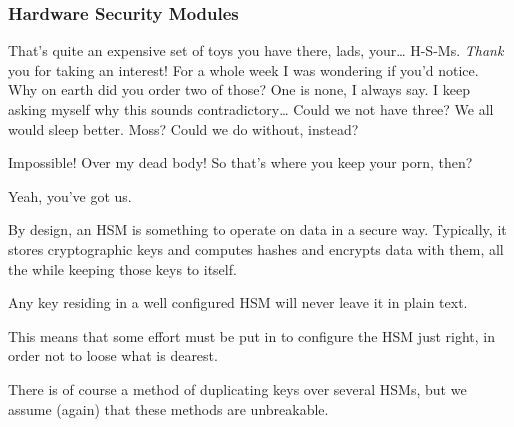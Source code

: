 \subsubsection{Hardware Security Modules}
\begin{dialogue}
		
				That's quite an expensive set of toys you have there, lads, your\ldots
				H-S-Ms.
	\textit{Thank} you for taking an interest!
				For a whole week I was wondering if you'd notice.
		Why on earth did you order two of those?
	One is none, I always say.
				I keep asking myself why this sounds contradictory\ldots
{}		Could we not have three? We all would sleep better. Moss?
		Could we do without, instead?
\par\medskip{}
	
				Impossible!
		
				Over my dead body!
		
				So that's where you keep your porn, then?
\par\medskip{}
		Yeah, you've got us. 
\end{dialogue}
By design,
an HSM is something to operate on data in a secure way.
Typically,
it stores cryptographic keys and computes hashes and encrypts data with them,
all the while keeping those keys to itself.
\begin{moafu}
Any key residing in a well configured HSM will never leave it in plain text.
\end{moafu}
This means that some effort must be put in to configure the HSM just right, in order not to loose what is dearest.
\par
There is of course a method of duplicating keys over several HSMs,
but we assume
(again)
that these methods are unbreakable.
